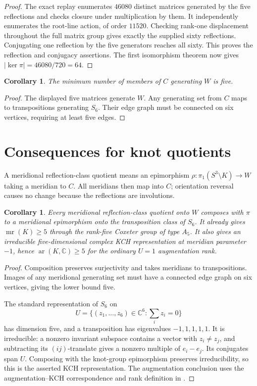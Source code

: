 \documentclass[11pt]{article}
\newtheorem{corollary}[theorem]{Corollary}
\newcommand{\C}{\mathbb C}
\newcommand{\mr}{\operatorname{mr}}
\begin{document}
\begin{proof}
The exact replay enumerates $46080$ distinct matrices generated by
the five reflections and checks closure under multiplication by them.
It independently enumerates the root-line action, of order $11520$.
Checking rank-one displacement throughout the full matrix group gives
exactly the supplied sixty reflections. Conjugating one reflection
by the five generators reaches all sixty. This proves the reflection
and conjugacy assertions. The first isomorphism theorem now gives
$|\ker\pi|=46080/720=64$.
\end{proof}

\begin{corollary}\label{cor:classrank}
The minimum number of members of $C$ generating $W$ is five.
\end{corollary}
\begin{proof}
The displayed five matrices generate $W$. Any generating set from
$C$ maps to transpositions generating $S_6$. Their edge graph must
be connected on six vertices, requiring at least five edges.
\end{proof}

\section*{Consequences for knot quotients}
A meridional reflection-class quotient means an epimorphism
$\rho:\pi_1(S^3\setminus K)\to W$ taking a meridian to $C$.
All meridians then map into $C$; orientation reversal causes no
change because the reflections are involutions.

\begin{corollary}\label{cor:dominance}
Every meridional reflection-class quotient onto $W$ composes with
$\pi$ to a meridional epimorphism onto the transposition class of
$S_6$. It already gives $\mr(K)\ge5$ through the rank-five Coxeter
group of type $A_5$. It also gives an irreducible five-dimensional
complex KCH representation at meridian parameter $-1$, hence
$\operatorname{ar}(K,\C)\ge5$ for the ordinary $U=1$ augmentation rank.
\end{corollary}
\begin{proof}
Composition preserves surjectivity and takes meridians to
transpositions. Images of any meridional generating set must have a
connected edge graph on six vertices, giving the lower bound five.

The standard representation of $S_6$ on
\[
       U=\{(z_1,\ldots,z_6)\in\C^6:\textstyle\sum_i z_i=0\}
\]
has dimension five, and a transposition has eigenvalues
$-1,1,1,1,1$. It is irreducible: a nonzero invariant subspace
contains a vector with $z_i\ne z_j$, and subtracting its $(ij)$-translate
gives a nonzero multiple of $e_i-e_j$. Its conjugates span $U$.
Composing with the knot-group epimorphism preserves irreducibility,
so this is the asserted KCH representation.
The augmentation conclusion uses the augmentation--KCH correspondence
and rank definition in \cite[Theorem~1.2 and Definition~1.8]{cor17}.
\end{proof}
\end{document}
